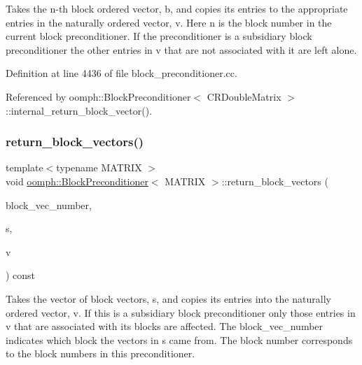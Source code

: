 Takes the n-\/th block ordered vector, b, and copies its entries to the appropriate entries in the naturally ordered vector, v. Here n is the block number in the current block preconditioner. If the preconditioner is a subsidiary block preconditioner the other entries in v that are not associated with it are left alone. 



Definition at line 4436 of file block\+\_\+preconditioner.\+cc.



Referenced by oomph\+::\+Block\+Preconditioner$<$ C\+R\+Double\+Matrix $>$\+::internal\+\_\+return\+\_\+block\+\_\+vector().

\mbox{\label{classoomph_1_1BlockPreconditioner_a71d48d8a70151ef0febd4537a2214c53}} 
\subsubsection{\texorpdfstring{return\+\_\+block\+\_\+vectors()}{return\_block\_vectors()}\hspace{0.1cm}{\footnotesize\ttfamily [1/2]}}
{\footnotesize\ttfamily template$<$typename M\+A\+T\+R\+IX $>$ \\
void \hyperlink{classoomph_1_1BlockPreconditioner}{oomph\+::\+Block\+Preconditioner}$<$ M\+A\+T\+R\+IX $>$\+::return\+\_\+block\+\_\+vectors (\begin{DoxyParamCaption}\item[{const \hyperlink{classoomph_1_1Vector}{Vector}$<$ unsigned $>$ \&}]{block\+\_\+vec\+\_\+number,  }\item[{const \hyperlink{classoomph_1_1Vector}{Vector}$<$ \hyperlink{classoomph_1_1DoubleVector}{Double\+Vector} $>$ \&}]{s,  }\item[{\hyperlink{classoomph_1_1DoubleVector}{Double\+Vector} \&}]{v }\end{DoxyParamCaption}) const}



Takes the vector of block vectors, s, and copies its entries into the naturally ordered vector, v. If this is a subsidiary block preconditioner only those entries in v that are associated with its blocks are affected. The block\+\_\+vec\+\_\+number indicates which block the vectors in s came from. The block number corresponds to the block numbers in this preconditioner. 




